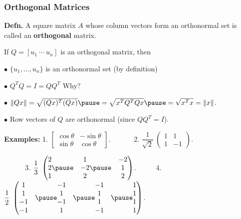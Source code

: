 \documentclass[handout]{beamer}
\begin{document}
\begin{frame}
\frametitle{Orthogonal Matrices}\pause

\textcolor{dgreen}{\bf Defn.} A square matrix $A$ whose column vectors form an
orthonormal set is called an {\bf orthogonal} matrix. \pause\medskip

If $Q = [u_1~ \cdots~ u_n]$ is an orthogonal matrix, then \pause 

$\bullet$  $\{u_1, \ldots, u_n\}$ is an orthonormal set \pause (by definition) \pause

$\bullet$  $Q^T Q = I = QQ^T$ \pause Why? \pause

$\bullet$ $\|Qx\|= \sqrt {(Qx)^T(Qx)} \pause = \sqrt {x^TQ^TQx} \pause=\sqrt {
x^Tx} = \|x\| $. \pause

$\bullet$  Row vectors of $Q$ are orthonormal \pause (since $QQ^T=I$). \pause  \smallskip

\textcolor{dgreen}{\bf Examples:}
1. $\left[\begin{array}{cc} \cos \theta & -\sin \theta \\ \sin \theta & \cos \theta \end{array} \right]$.\pause ~~~~~~ 
2.  $\dfrac 1{\sqrt 2}~ \begin{pmatrix} 1 & 1 \\ 1 & -1 \end{pmatrix}$.\pause\medskip


~~~~~~3. $\dfrac 1{3}~\left(\begin{matrix}
  2\\2\\1 \end{matrix} \pause ~~~ \begin{matrix} 1\\-2\\2 \end{matrix}
\pause ~~~ \begin{matrix} -2\\1\\2 \end{matrix}\right)$. \pause ~~~~~4.  $\dfrac 12 ~ \left(\begin{matrix}
1\\1\\-1\\-1 \end{matrix}~~~ \pause \begin{matrix}
-1\\1\\-1\\1 \end{matrix} ~~~ \pause \begin{matrix} -1\\1\\1\\-1 \end{matrix}
 ~~~ \pause \begin{matrix} 1 \\ 1\\ 1\\ 1 \end{matrix}\right)$.
\end{frame}
\end{document}
